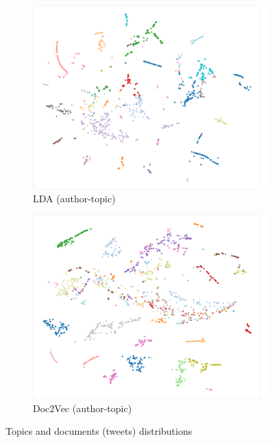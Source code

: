 \documentclass[11pt]{article}
\begin{document}
\begin{figure}[H]
    \begin{subfigure}{.49\linewidth}
    \includegraphics[width=\linewidth]{lda_grp}
    \caption{LDA (author-topic)}\label{fig:res_lda_grp}
    \end{subfigure}
    \begin{subfigure}{.49\linewidth}
    \includegraphics[width=\linewidth]{doc_grp}
    \caption{Doc2Vec (author-topic)}\label{fig:res_doc_grp}
    \end{subfigure}
    
    \caption{Topics and documents (tweets) distributions}
    \label{fig:res_distribution}
\end{figure}
\end{document}
